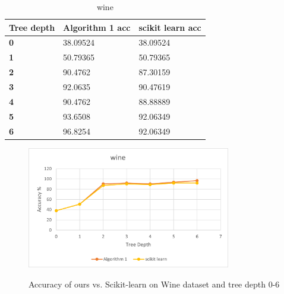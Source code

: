 \documentclass{article}
\begin{document}
\begin{multicols}{2}



\begin{table}[H]
\caption{ wine}
\label{tab:my-table}
\begin{tabular}{|l|l|l|}
\hline
\textbf{Tree depth} & Algorithm 1 acc & scikit learn acc \\ \hline
\textbf{0} & 38.09524 & 38.09524 \\ \hline
\textbf{1} & 50.79365 & 50.79365 \\ \hline
\textbf{2} & 90.4762 & 87.30159 \\ \hline
\textbf{3} & 92.0635 & 90.47619 \\ \hline
\textbf{4} & 90.4762 & 88.88889 \\ \hline
\textbf{5} & 93.6508 & 92.06349 \\ \hline
\textbf{6} & 96.8254 & 92.06349 \\ \hline
\end{tabular}
\end{table}

\begin{figure}[H]
\centering
\includegraphics[width=3.5in]{wine_acc.png}
\caption{}
\label{fig:label}{Accuracy of ours vs. Scikit-learn on Wine dataset and tree depth 0-6}
\end{figure}
\end{multicols}
\end{document}
